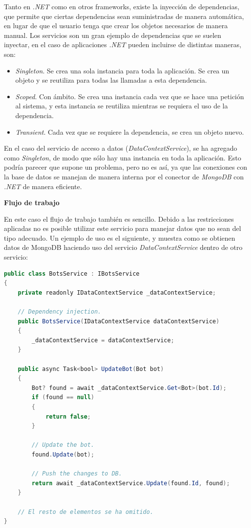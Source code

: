 Tanto en \textit{.NET} como en otros frameworks, existe la inyección de dependencias, que permite que ciertas dependencias sean suministradas de manera automática, en lugar de que el usuario tenga que crear los objetos necesarios de manera manual. Los servicios son un gran ejemplo de dependencias que se suelen inyectar, en el caso de aplicaciones \textit{.NET} pueden incluirse de distintas maneras, son:

\begin{itemize}
	\item \textit{Singleton}. Se crea una sola instancia para toda la aplicación. Se crea un objeto y se reutiliza para todas las llamadas a esta dependencia.
	\item \textit{Scoped}. Con ámbito. Se crea una instancia cada vez que se hace una petición al sistema, y esta instancia se reutiliza mientras se requiera el uso de la dependencia.
	\item \textit{Transient}. Cada vez que se requiere la dependencia, se crea un objeto nuevo.
\end{itemize}

En el caso del servicio de acceso a datos (\textit{DataContextService}), se ha agregado como \textit{Singleton}, de modo que sólo hay una instancia en toda la aplicación. Esto podría parecer que supone un problema, pero no es así, ya que las conexiones con la base de datos se manejan de manera interna por el conector de \textit{MongoDB} con \textit{.NET} de manera eficiente.


\medskip 

\textbf{Flujo de trabajo}

En este caso el flujo de trabajo también es sencillo. Debido a las restricciones aplicadas no es posible utilizar este servicio para manejar datos que no sean del tipo adecuado. Un ejemplo de uso es el siguiente, y muestra como se obtienen datos de MongoDB haciendo uso del servicio \textit{DataContextService} dentro de otro servicio:

\begin{lstlisting}[language=java]
public class BotsService : IBotsService
{
    private readonly IDataContextService _dataContextService;

	// Dependency injection.
    public BotsService(IDataContextService dataContextService)
    {
        _dataContextService = dataContextService;
    }
    
    public async Task<bool> UpdateBot(Bot bot)
    {
        Bot? found = await _dataContextService.Get<Bot>(bot.Id);
        if (found == null)
        {
            return false;
        }

        // Update the bot.
        found.Update(bot);

        // Push the changes to DB.
        return await _dataContextService.Update(found.Id, found);
    }
    
    // El resto de elementos se ha omitido.
}
\end{lstlisting}





